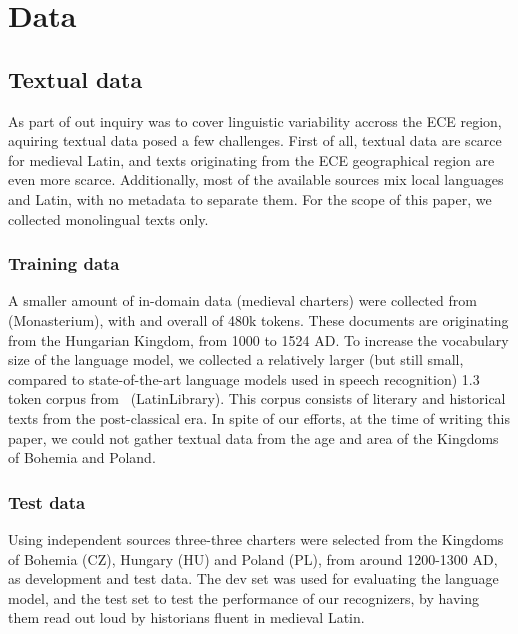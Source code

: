 \documentclass[runningheads,a4paper]{llncs}
\begin{document}
\section{Data}
\subsection{Textual data}
As part of out inquiry was to cover linguistic variability accross the ECE region, aquiring textual data posed a few challenges.
First of all, textual data are scarce for medieval Latin, and texts originating from the ECE geographical region are even more scarce.
Additionally, most of the available sources mix local languages and Latin, with no metadata to separate them.
For the scope of this paper, we collected monolingual texts only.
\subsubsection{Training data}
A smaller amount of in-domain data (medieval charters) were collected from~\cite{monasterium} (Monasterium), with and overall of 480k tokens.
These documents are originating from the Hungarian Kingdom, from 1000 to 1524 AD.
To increase the vocabulary size of the language model, we collected a relatively larger (but still small, compared to state-of-the-art language models used in speech recognition) 1.3 token corpus from~\cite{latinlibrary} (LatinLibrary).
This corpus consists of literary and historical texts from the post-classical era.
In spite of our efforts, at the time of writing this paper, we could not gather textual data from the age and area of the Kingdoms of Bohemia and Poland.
\subsubsection{Test data}
Using independent sources three-three charters were selected from the Kingdoms of Bohemia (CZ), Hungary (HU) and Poland (PL), from around 1200-1300 AD, as development and test data.
The dev set was used for evaluating the language model, and the test set to test the performance of our recognizers, by having them read out loud by historians fluent in medieval Latin.
\end{document}
